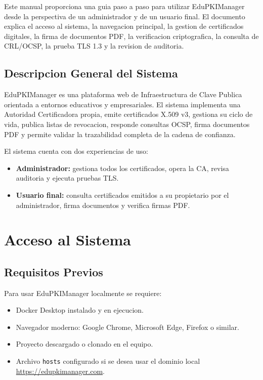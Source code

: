 \documentclass[12pt,a4paper]{article}
\begin{document}
Este manual proporciona una guia paso a paso para utilizar EduPKIManager desde la perspectiva de un administrador y de un usuario final. El documento explica el acceso al sistema, la navegacion principal, la gestion de certificados digitales, la firma de documentos PDF, la verificacion criptografica, la consulta de CRL/OCSP, la prueba TLS 1.3 y la revision de auditoria.

\subsection{Descripcion General del Sistema}

EduPKIManager es una plataforma web de Infraestructura de Clave Publica orientada a entornos educativos y empresariales. El sistema implementa una Autoridad Certificadora propia, emite certificados X.509 v3, gestiona su ciclo de vida, publica listas de revocacion, responde consultas OCSP, firma documentos PDF y permite validar la trazabilidad completa de la cadena de confianza.

El sistema cuenta con dos experiencias de uso:

\begin{itemize}[leftmargin=*]
    \item \textbf{Administrador:} gestiona todos los certificados, opera la CA, revisa auditoria y ejecuta pruebas TLS.
    \item \textbf{Usuario final:} consulta certificados emitidos a su propietario por el administrador, firma documentos y verifica firmas PDF.
\end{itemize}

\section{Acceso al Sistema}

\subsection{Requisitos Previos}

Para usar EduPKIManager localmente se requiere:

\begin{itemize}[leftmargin=*]
    \item Docker Desktop instalado y en ejecucion.
    \item Navegador moderno: Google Chrome, Microsoft Edge, Firefox o similar.
    \item Proyecto descargado o clonado en el equipo.
    \item Archivo \texttt{hosts} configurado si se desea usar el dominio local \url{https://edupkimanager.com}.
\end{itemize}
\end{document}
